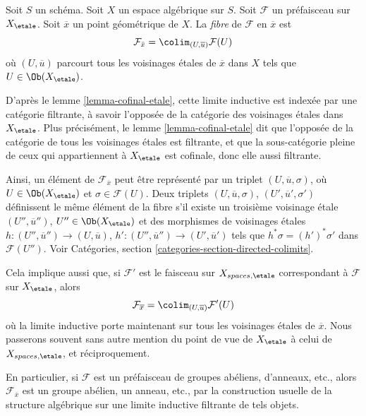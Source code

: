 \begin{definition}
\label{definition-stalk}
Soit $S$ un schéma. Soit $X$ un espace algébrique sur $S$.
Soit $\mathcal{F}$ un préfaisceau sur $X_\etale$.
Soit $\overline{x}$ un point géométrique de $X$.
La {\it fibre} de $\mathcal{F}$ en $\overline{x}$ est
$$
\mathcal{F}_{\bar x}
=
\colim_{(U, \overline{u})} \mathcal{F}(U)
$$
où $(U, \overline{u})$ parcourt tous les voisinages \'etales
de $\overline{x}$ dans $X$ tels que $U \in \Ob(X_\etale)$.
\end{definition}

\noindent
D'après le
lemme \ref{lemma-cofinal-etale},
cette limite inductive est indexée par une catégorie filtrante,
à savoir l'opposée de la catégorie des voisinages \'etales
dans $X_\etale$. Plus précisément, le
lemme \ref{lemma-cofinal-etale}
dit que l'opposée de la catégorie de tous les voisinages \'etales est filtrante,
et que la sous-catégorie pleine de ceux qui appartiennent à $X_\etale$ est
cofinale, donc elle aussi filtrante.

\medskip\noindent
Ainsi, un élément de $\mathcal{F}_{\overline{x}}$ peut être
représenté par un triplet $(U, \overline{u}, \sigma)$, où
$U \in \Ob(X_\etale)$ et $\sigma \in \mathcal{F}(U)$.
Deux triplets $(U, \overline{u}, \sigma)$, $(U', \overline{u}', \sigma')$
définissent le même élément de la fibre s'il existe un troisième
voisinage \'etale
$(U'', \overline{u}'')$, $U'' \in \Ob(X_\etale)$
et des morphismes de voisinages \'etales
$h : (U'', \overline{u}'') \to (U, \overline{u})$,
$h' : (U'', \overline{u}'') \to (U', \overline{u}')$ tels que
$h^*\sigma = (h')^*\sigma'$ dans $\mathcal{F}(U'')$. Voir
Catégories, section \ref{categories-section-directed-colimits}.

\medskip\noindent
Cela implique aussi que, si $\mathcal{F}'$ est le faisceau sur
$X_{spaces, \etale}$ correspondant à $\mathcal{F}$ sur
$X_\etale$, alors
\begin{equation}
\label{equation-stalk-spaces-etale}
\mathcal{F}_{\overline{x}} = \colim_{(U, \overline{u})} \mathcal{F}'(U)
\end{equation}
où la limite inductive porte maintenant sur tous les voisinages \'etales de $\overline{x}$.
Nous passerons souvent sans autre mention du point de vue de $X_\etale$
à celui de $X_{spaces, \etale}$, et réciproquement.

\medskip\noindent
En particulier, si $\mathcal{F}$ est un préfaisceau de
groupes abéliens, d'anneaux, etc., alors $\mathcal{F}_{\overline{x}}$ est
un groupe abélien, un anneau, etc., par la construction usuelle de la
structure algébrique sur une limite inductive filtrante de tels objets.

